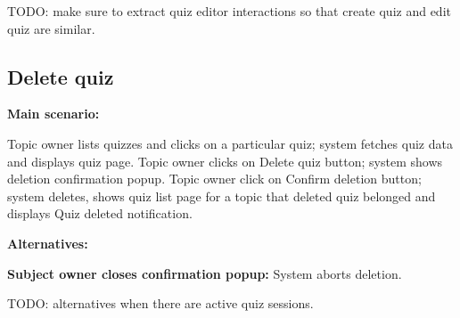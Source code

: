 \documentclass[
    english, %
]{VUMIFPSkursinis}
\begin{document}
TODO: make sure to extract quiz editor interactions so that create quiz and edit quiz are similar.

\subsection{Delete quiz}

\noindent\textbf{\fontsize{13}{15}\selectfont Main scenario:}

Topic owner lists quizzes and clicks on a particular quiz; system fetches quiz data and displays quiz page. Topic owner clicks on Delete quiz button; system shows deletion confirmation popup. Topic owner click on Confirm deletion button; system deletes, shows quiz list page for a topic that deleted quiz belonged and displays Quiz deleted notification.

\noindent\textbf{\fontsize{13}{15}\selectfont Alternatives:}

\textbf{Subject owner closes confirmation popup:} System aborts deletion.

TODO: alternatives when there are active quiz sessions.

\listoffigures
\printbibliography[heading=bibintoc]
\end{document}
